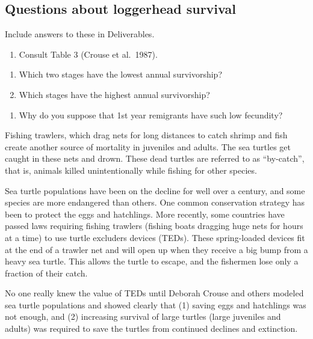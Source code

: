 \documentclass[
  letterpaper,
  DIV=11,
  numbers=noendperiod]{scrreprt}
\providecommand{\tightlist}{%
  \setlength{\itemsep}{0pt}\setlength{\parskip}{0pt}}
\begin{document}
\subsection{Questions about loggerhead
survival}\label{questions-about-loggerhead-survival}

Include answers to these in Deliverables.

\begin{enumerate}
\def\labelenumi{\arabic{enumi}.}
\tightlist
\item
  Consult Table 3 (Crouse et al.~1987).
\end{enumerate}

\begin{enumerate}
\def\labelenumi{\alph{enumi}.}
\tightlist
\item
  Which two stages have the lowest annual survivorship?
\item
  Which stages have the highest annual survivorship?
\end{enumerate}

\begin{enumerate}
\def\labelenumi{\arabic{enumi}.}
\tightlist
\item
  Why do you suppose that 1st year remigrants have such low fecundity?
\end{enumerate}

Fishing trawlers, which drag nets for long distances to catch shrimp and
fish create another source of mortality in juveniles and adults. The sea
turtles get caught in these nets and drown. These dead turtles are
referred to as ``by-catch'', that is, animals killed unintentionally
while fishing for other species.

Sea turtle populations have been on the decline for well over a century,
and some species are more endangered than others. One common
conservation strategy has been to protect the eggs and hatchlings. More
recently, some countries have passed laws requiring fishing trawlers
(fishing boats dragging huge nets for hours at a time) to use turtle
excluders devices (TEDs). These spring-loaded devices fit at the end of
a trawler net and will open up when they receive a big bump from a heavy
sea turtle. This allows the turtle to escape, and the fishermen lose
only a fraction of their catch.

No one really knew the value of TEDs until Deborah Crouse and others
modeled sea turtle populations and showed clearly that (1) saving eggs
and hatchlings was not enough, and (2) increasing survival of large
turtles (large juveniles and adults) was required to save the turtles
from continued declines and extinction.
\end{document}
